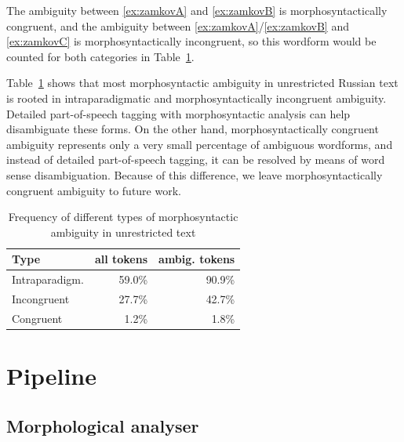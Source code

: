 \documentclass[11pt]{article}
\begin{document}
The ambiguity between \ref{ex:zamkovA} and \ref{ex:zamkovB} is morphosyntactically congruent, and
the ambiguity between \ref{ex:zamkovA}/\ref{ex:zamkovB} and \ref{ex:zamkovC} is
morphosyntactically incongruent, so this wordform would be counted for both categories in
Table~\ref{table:ambiguity}.

Table~\ref{table:ambiguity} shows that most morphosyntactic ambiguity in 
unrestricted Russian text is rooted in intraparadigmatic and morphosyntactically 
incongruent ambiguity. Detailed part-of-speech tagging with morphosyntactic 
analysis can help disambiguate these forms. On the other hand, morphosyntactically congruent
ambiguity represents only a very small percentage of ambiguous wordforms, and instead 
of detailed part-of-speech tagging, it can be resolved by means of word sense disambiguation.
Because of this difference, we leave morphosyntactically congruent ambiguity to future work.

\begin{table}[ht]
  \centering
  \begin{tabular}{l|rr}
    \hline
    \textbf{Type}  & \textbf{all tokens} & \textbf{ambig. tokens} \\
    \hline
    Intraparadigm. & 59.0\%                   & 90.9\%   \\
    Incongruent    & 27.7\%                   & 42.7\%   \\ 
    Congruent      & 1.2\%                   & 1.8\%    \\ 
    \hline
  \end{tabular}
  \caption{Frequency of different types of morphosyntactic ambiguity in unrestricted text}
  \label{table:ambiguity}
\end{table}



\section{Pipeline}
\label{sec:pipeline}

\subsection{Morphological analyser}
\label{sec:morph}
\end{document}
